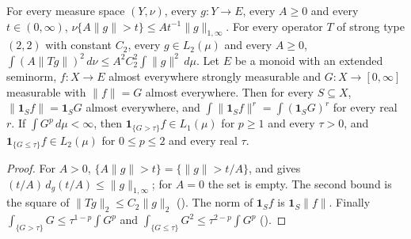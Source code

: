 \begin{lemma}
\label{lem:truncation-level}
\leanok
{}
For every measure space $(Y, \nu)$, every $g : Y \to E$, every $A \geq 0$ and every
$t \in (0, \infty)$, $\nu\{A \|g\| > t\} \leq A t^{-1} \|g\|_{1, \infty}$. For every operator
$T$ of strong type $(2, 2)$ with constant $C_2$, every $g \in L_2(\mu)$ and every $A \geq 0$,
$\int (A \|T g\|)^2 \, d\nu \leq A^2 C_2^2 \int \|g\|^2 \, d\mu$. Let $E$ be a monoid with an
extended seminorm, $f : X \to E$ almost everywhere strongly measurable and
$G : X \to [0, \infty]$ measurable with $\|f\| = G$ almost everywhere. Then for every
$S \subseteq X$, $\|\mathbf 1_S f\| = \mathbf 1_S G$ almost everywhere, and
$\int \|\mathbf 1_S f\|^r = \int (\mathbf 1_S G)^r$ for every real $r$. If
$\int G^p \, d\mu < \infty$, then $\mathbf 1_{\{G > \tau\}} f \in L_1(\mu)$ for $p \geq 1$ and
every $\tau > 0$, and $\mathbf 1_{\{G \leq \tau\}} f \in L_2(\mu)$ for $0 \leq p \leq 2$ and
every real $\tau$.
\end{lemma}

\begin{proof}
\leanok
For $A > 0$, $\{A \|g\| > t\} = \{\|g\| > t/A\}$, and 
gives $(t/A) \, d_g(t/A) \leq \|g\|_{1, \infty}$; for $A = 0$ the set is empty. The second bound
is the square of $\|T g\|_2 \leq C_2 \|g\|_2$ (). The
norm of $\mathbf 1_S f$ is $\mathbf 1_S \|f\|$. Finally
$\int_{\{G > \tau\}} G \leq \tau^{1-p} \int G^p$ and
$\int_{\{G \leq \tau\}} G^2 \leq \tau^{2-p} \int G^p$ ().
\end{proof}


